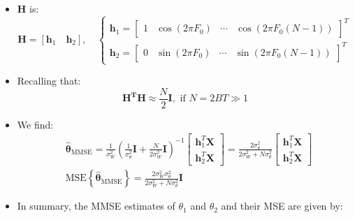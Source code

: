 \begin{itemize}
\begin{align*}
&\mathbf{\hat{\boldsymbol{\theta}}}_{\text{MMSE}} = \frac{1}{\sigma_{W}^{2}}\left(\frac{1}{\sigma_{\theta}^{2}}\mathbf{I} + \frac{1}{\sigma_{W}^{2}}\mathbf{H}^{T}\mathbf{H}\right)^{-1}\mathbf{H}^{T}\mathbf{X} \\
&\text{MSE}\left\{\mathbf{\hat{\boldsymbol{\theta}}}_{\text{MMSE}}\right\} = \left(\frac{1}{\sigma_{\theta}^{2}}\mathbf{I} + \frac{1}{\sigma_{W}^{2}}\mathbf{H}^{T}\mathbf{H}\right)^{-1},\qquad \text{where} \quad\sigma_{\theta}^2=\frac{\sigma_A^2}{2B}, \quad\sigma_W^2=\frac{N_0}{2}
\end{align*}
\item \textbf{H} is:
$$
\mathbf{H} = [\mathbf{h}_{1} \quad \mathbf{h}_{2}], \quad
\begin{cases}
\mathbf{h}_{1} = \begin{bmatrix} 1 & \cos(2\pi F_{0}) & \cdots & \cos(2\pi F_{0}(N-1)) \end{bmatrix}^{T} \\
\mathbf{h}_{2} = \begin{bmatrix} 0 & \sin(2\pi F_{0}) & \cdots & \sin(2\pi F_{0}(N-1)) \end{bmatrix}^{T}
\end{cases}
$$
\item Recalling that: \[
\mathbf{H^T}\mathbf{H}\approx \frac{N}{2}\textbf{I},\text{ if }N=2BT\gg1
\]
\item We find:
\begin{align*}
&\mathbf{\hat{\boldsymbol{\theta}}}_{\text{MMSE}} = \frac{1}{\sigma_{W}^{2}}\left(\frac{1}{\sigma_{\theta}^{2}}\mathbf{I} + \frac{N}{2\sigma_{W}^{2}}\mathbf{I}\right)^{-1} \begin{bmatrix} \mathbf{h}_{1}^{T}\mathbf{X} \\ \mathbf{h}_{2}^{T}\mathbf{X} \end{bmatrix} = \frac{2\sigma_{\theta}^{2}}{2\sigma_{W}^{2} + N\sigma_{\theta}^{2}} \begin{bmatrix} \mathbf{h}_{1}^{T}\mathbf{X} \\ \mathbf{h}_{2}^{T}\mathbf{X} \end{bmatrix} \\
&\text{MSE}\left\{\mathbf{\hat{\boldsymbol{\theta}}}_{\text{MMSE}}\right\} = \frac{2\sigma_{W}^{2}\sigma_{\theta}^{2}}{2\sigma_{W}^{2} + N\sigma_{\theta}^{2}}\mathbf{I}
\end{align*}
\item In summary, the MMSE estimates of \(\theta_1\) and \(\theta_2\) and their MSE are given by:


\end{itemize}
